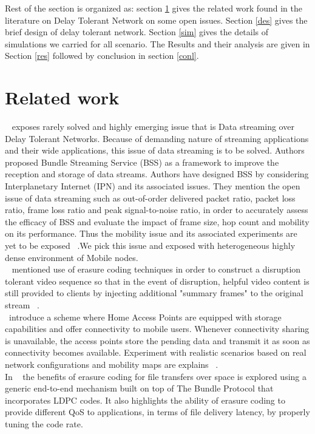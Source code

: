 \documentclass[3p,times]{elsarticle}
\begin{document}
Rest of the section is organized as: section \ref{rel} gives the related work found in the literature on Delay Tolerant Network on some open issues.  Section \ref{des} gives the brief design of delay tolerant network. Section \ref{sim} gives the details of simulations we carried for all scenario. The Results and their analysis are given in Section \ref{res} followed by conclusion in section \ref{conl}. 
\section{Related work} \label{rel}
~\cite{nr1} exposes rarely solved and highly emerging issue that is Data streaming over Delay Tolerant Networks. Because of demanding nature of streaming applications and their wide applications, this issue of data streaming is to be solved. Authors proposed Bundle Streaming Service (BSS) as a framework to improve the reception and storage of data streams. Authors have designed BSS by considering Interplanetary Internet (IPN) and its associated issues. They mention the open issue of data streaming such as out-of-order delivered packet ratio, packet loss ratio, frame loss ratio and peak signal-to-noise ratio, in order to accurately assess the efficacy of BSS and evaluate the impact of frame size, hop count and mobility on its performance. Thus the mobility issue and its associated experiments are yet to be exposed ~\cite {nr3}.We pick this issue and exposed with heterogeneous highly dense environment of Mobile nodes. \\
~\cite{nr2} mentioned use of erasure coding techniques in order to construct a disruption tolerant video sequence so that in the event of disruption, helpful video content is still provided to clients by injecting additional "summary frames" to the original stream ~\cite{nr4}.\\
~\cite{nr6}introduce a scheme where Home Access Points are equipped with storage capabilities and offer connectivity to mobile users. Whenever connectivity sharing is unavailable, the access points store the pending data and transmit it
as soon as connectivity becomes available. Experiment with realistic scenarios based on real network configurations and mobility maps are explains ~\cite {nr6}.\\
In ~\cite{nr7} the benefits of erasure coding for file transfers over space is explored using a generic end-to-end mechanism built on top of
The Bundle Protocol that incorporates LDPC codes. It also highlights the ability of erasure coding to provide different QoS to applications, in terms of file delivery latency, by properly tuning the code rate. \\
\end{document}
